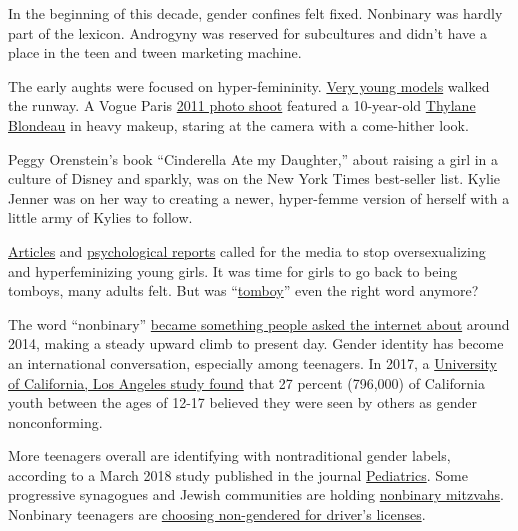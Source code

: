 In the beginning of this decade, gender confines felt fixed. Nonbinary
was hardly part of the lexicon. Androgyny was reserved for subcultures
and didn't have a place in the teen and tween marketing machine.

The early aughts were focused on hyper-femininity.
\href{https://slate.com/human-interest/2012/05/pre-teen-runway-models-tracking-the-trend.html}{Very
young models} walked the runway. A Vogue Paris
\href{https://jezebel.com/fashion-industry-salivates-over-creepy-photos-of-10-yea-5827092}{2011
photo shoot} featured a 10-year-old
\href{http://www.jezebel.com/5827092/fashion-industry-salivates-over-creepy-photos-of-10+year+old-french-girl}{Thylane
Blondeau} in heavy makeup, staring at the camera with a come-hither
look.

Peggy Orenstein's book ``Cinderella Ate my Daughter,'' about raising a
girl in a culture of Disney and sparkly, was on the New York Times
best-seller list. Kylie Jenner was on her way to creating a newer,
hyper-femme version of herself with a little army of Kylies to follow.

\href{https://www.nytimes.com/2010/06/13/magazine/13fob-wwln-t.html}{Articles}
and
\href{https://wp.nyu.edu/steinhardt-appliedpsychology/wp-content/uploads/sites/72/2015/10/Guidance-Expo-Sexualization-Final.pdf}{psychological
reports} called for the media to stop oversexualizing and
hyperfeminizing young girls. It was time for girls to go back to being
tomboys, many adults felt. But was
``\href{https://www.nytimes.com/2017/04/18/opinion/my-daughter-is-not-transgender-shes-a-tomboy.html}{tomboy}''
even the right word anymore?

The word ``nonbinary''
\href{https://trends.google.com/trends/explore?date=all\&geo=US\&q=nonbinary}{became
something people asked the internet about} around 2014, making a steady
upward climb to present day. Gender identity has become an international
conversation, especially among teenagers. In 2017, a
\href{https://williamsinstitute.law.ucla.edu/wp-content/uploads/CHIS-Transgender-Teens-FINAL.pdf}{University
of California, Los Angeles study found} that 27 percent (796,000) of
California youth between the ages of 12-17 believed they were seen by
others as gender nonconforming.

More teenagers overall are identifying with nontraditional gender
labels, according to a March 2018 study published in the journal
\href{https://pediatrics.aappublications.org/content/141/3/e20171683}{Pediatrics}.
Some progressive synagogues and Jewish communities are holding
\href{https://www.nytimes.com/2019/03/27/style/gender-fluid-bar-bat-mitzvah.html}{nonbinary
mitzvahs}. Nonbinary teenagers are
\href{https://www.nytimes.com/2019/05/29/us/nonbinary-drivers-licenses.html}{choosing
non-gendered for driver's licenses}.

